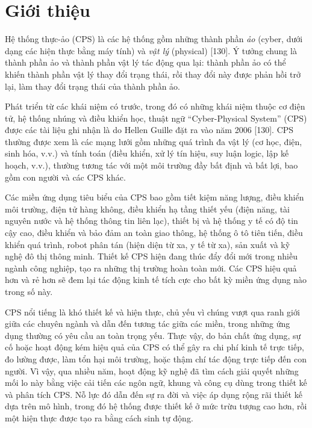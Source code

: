 \section{Giới thiệu}
Hệ thống thực-ảo (CPS) là các hệ thống gồm những thành phần \emph{ảo} (cyber, dưới dạng các hiện thực bằng máy tính) và \emph{vật lý} (physical) [130]. Ý tưởng chung là thành phần ảo và thành phần vật lý tác động qua lại: thành phần ảo có thể khiến thành phần vật lý thay đổi trạng thái, rồi thay đổi này được phản hồi trở lại, làm thay đổi trạng thái của thành phần ảo.

Phát triển từ các khái niệm có trước, trong đó có những khái niệm thuộc cơ điện tử, hệ thống nhúng và điều khiển học, thuật ngữ ``Cyber-Physical System'' (CPS) được các tài liệu ghi nhận là do Hellen Guille đặt ra vào năm 2006 [130]. CPS thường được xem là các mạng lưới gồm những quá trình đa vật lý (cơ học, điện, sinh hóa, v.v.) và tính toán (điều khiển, xử lý tín hiệu, suy luận logic, lập kế hoạch, v.v.), thường tương tác với một môi trường đầy bất định và bất lợi, bao gồm con người và các CPS khác.

Các miền ứng dụng tiêu biểu của CPS bao gồm tiết kiệm năng lượng, điều khiển môi trường, điện tử hàng không, điều khiển hạ tầng thiết yếu (điện năng, tài nguyên nước và hệ thống thông tin liên lạc), thiết bị và hệ thống y tế có độ tin cậy cao, điều khiển và bảo đảm an toàn giao thông, hệ thống ô tô tiên tiến, điều khiển quá trình, robot phân tán (hiện diện từ xa, y tế từ xa), sản xuất và kỹ nghệ đô thị thông minh. Thiết kế CPS hiện đang thúc đẩy
đổi mới trong nhiều ngành công nghiệp, tạo ra những thị trường hoàn toàn mới. Các CPS hiệu quả hơn và rẻ hơn sẽ đem lại tác động kinh tế tích cực cho bất kỳ miền ứng dụng nào trong số này.

CPS nổi tiếng là khó thiết kế và hiện thực, chủ yếu vì chúng vượt qua ranh giới giữa các chuyên ngành và dẫn đến tương tác giữa các miền, trong những ứng dụng thường có yêu cầu an toàn trọng yếu. Thực vậy, do bản chất ứng dụng, sự cố hoặc hoạt động kém hiệu quả của CPS có thể gây ra chi phí kinh tế trực tiếp, đo lường được, làm tổn hại môi trường, hoặc thậm chí tác động trực tiếp đến con người. Vì vậy, qua nhiều năm, hoạt động kỹ nghệ đã tìm cách giải quyết những mối lo này bằng việc cải tiến các ngôn ngữ, khung và công cụ dùng trong thiết kế và phân tích CPS. Nỗ lực đó dẫn đến sự ra đời và việc áp dụng rộng rãi thiết kế dựa trên mô hình, trong đó hệ thống được thiết kế ở mức trừu tượng cao hơn, rồi một hiện thực được tạo ra bằng cách sinh tự động.

